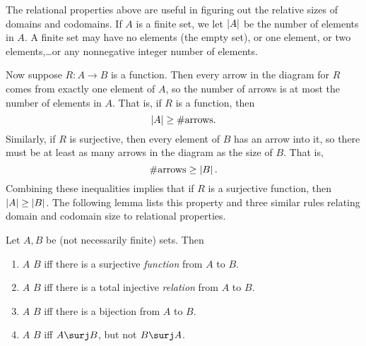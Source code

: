 \label{mappingrule_sec}

The relational properties above are useful in figuring out the relative
sizes of domains and codomains.  If $A$ is a finite set, we let $\left|A\right|$
be the number of elements in $A$.  A finite set may have no elements (the
empty set), or one element, or two elements,\dots or any nonnegative
integer number of elements.

Now suppose $R:A \to B$ is a function.  Then every arrow in the diagram
for $R$ comes from exactly one element of $A$, so the number of arrows is
at most the number of elements in $A$.  That is, if $R$ is a function,
then
\[
\left|A\right| \geq \#\text{arrows}.
\]
Similarly, if $R$ is surjective, then every element of $B$ has an arrow
into it, so there must be at least as many arrows in the diagram as the
size of $B$.  That is,
\[
\#\text{arrows} \geq \left|B\right|.
\]
Combining these inequalities implies that if $R$ is a surjective function,
then $\left|A\right| \geq \left|B\right|$.  The following lemma lists this property and three
similar rules relating domain and codomain size to relational properties.

\begin{definition}\label{bigger}
  Let $A,B$ be (not necessarily finite) sets.  Then
  \begin{enumerate}
  \item $A$ \term{$\surj$} $B$ iff there is a surjective \emph{function} from $A$ to $B$.  

  \item $A$ \term{$\inj$} $B$ iff there is a total injective \emph{relation} from $A$ to $B$.

  \item $A$ \term{$\bij$} $B$ iff there is a bijection from $A$ to $B$.  

  \item $A$ \term{$\strict$} $B$ iff $A \surj B$, but not $B \surj A$.  

  \end{enumerate}
\end{definition}

